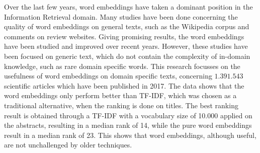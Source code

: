 \documentclass[../../Thesis.tex]{subfiles}
\begin{document}
Over the last few years, word embeddings have taken a dominant position in the Information Retrieval domain. Many studies have been done concerning the quality of word embeddings on general texts, such as the Wikipedia corpus and comments on review websites. Giving promising results, the word embeddings have been studied and improved over recent years. However, these studies have been focused on generic text, which do not contain the complexity of in-domain knowledge, such as rare domain specific words. This research focusses on the usefulness of word embeddings on domain specific texts, concerning $1.391.543$ scientific articles which have been published in 2017. The data shows that the word embeddings only perform better than TF-IDF, which was chosen as a traditional alternative, when the ranking is done on titles. The best ranking result is obtained through a TF-IDF with a vocabulary size of 10.000 applied on the abstracts, resulting in a median rank of 14, while the pure word embeddings result in a median rank of 23. This shows that word embeddings, although useful, are not unchallenged by older techniques.
\end{document}
